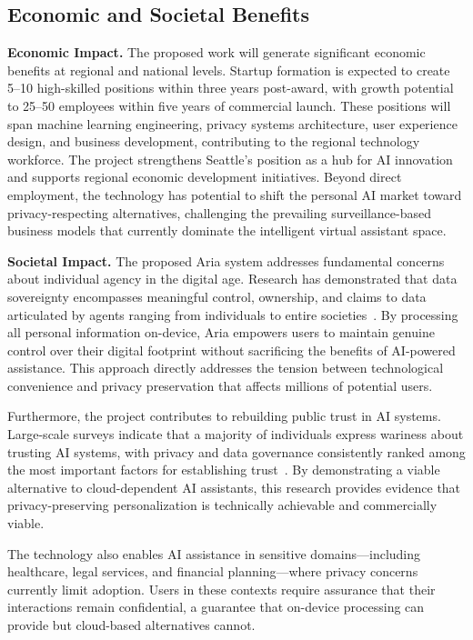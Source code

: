 \documentclass[11pt]{article}
\begin{document}
\subsection{Economic and Societal Benefits}
\vspace*{-8pt}
\textbf{Economic Impact.}
The proposed work will generate significant economic benefits at regional and 
national levels. Startup formation is expected to create 5--10 high-skilled 
positions within three years post-award, with growth potential to 25--50 
employees within five years of commercial launch. These positions will span 
machine learning engineering, privacy systems architecture, user experience 
design, and business development, contributing to the regional technology 
workforce. The project strengthens Seattle's position as a hub for AI innovation 
and supports regional economic development initiatives. Beyond direct employment, 
the technology has potential to shift the personal AI market toward 
privacy-respecting alternatives, challenging the prevailing surveillance-based 
business models that currently dominate the intelligent virtual assistant space.

\textbf{Societal Impact.}
The proposed Aria system addresses fundamental concerns about individual agency 
in the digital age. Research has demonstrated that data sovereignty encompasses 
meaningful control, ownership, and claims to data articulated by agents ranging 
from individuals to entire societies~\cite{hummel2021data}. By processing all 
personal information on-device, Aria empowers users to maintain genuine control 
over their digital footprint without sacrificing the benefits of AI-powered 
assistance. This approach directly addresses the tension between technological 
convenience and privacy preservation that affects millions of potential users.

Furthermore, the project contributes to rebuilding public trust in AI systems. 
Large-scale surveys indicate that a majority of individuals express wariness 
about trusting AI systems, with privacy and data governance consistently ranked 
among the most important factors for establishing trust~\cite{gillespie2023trust}. 
By demonstrating a viable alternative to cloud-dependent AI assistants, this 
research provides evidence that privacy-preserving personalization is technically 
achievable and commercially viable.

The technology also enables AI assistance in sensitive domains---including 
healthcare, legal services, and financial planning---where privacy concerns 
currently limit adoption. Users in these contexts require assurance that their 
interactions remain confidential, a guarantee that on-device processing can 
provide but cloud-based alternatives cannot.
\end{document}
